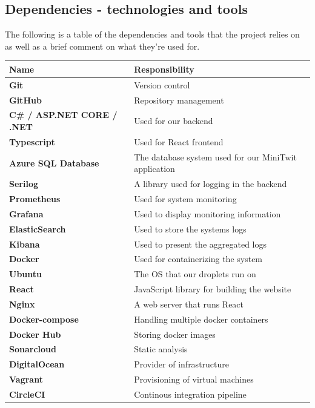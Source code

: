 \subsection{Dependencies - technologies and tools}
The following is a table of the dependencies and tools that the project relies on as well as a brief comment on what they're used for.
\begin{center}
\begin{tabularx}{\textwidth}{|X|l|}
 \hline
 \textbf{Name} & \textbf{Responsibility}  \\ [0.5ex] 
 \hline\hline
 \textbf{Git} & Version control  \\ 
 \hline
 \textbf{GitHub} & Repository management \\
 \hline
 \textbf{C\# / ASP.NET CORE / .NET} & Used for our backend \\
 \hline
 \textbf{Typescript} & Used for React frontend \\
 \hline
 \textbf{Azure SQL Database} & The database system used for our MiniTwit application\\ 
 \hline
 \textbf{Serilog} & A library used for logging in the backend \\
 \hline
 \textbf{Prometheus} & Used for system monitoring \\
 \hline
 \textbf{Grafana} & Used to display monitoring information\\
 \hline
 \textbf{ElasticSearch} & Used to store the systems logs \\
 \hline
 \textbf{Kibana} & Used to present the aggregated logs \\
 \hline
 \textbf{Docker} & Used for containerizing the system \\
 \hline
 \textbf{Ubuntu} & The OS that our droplets run on\\
 \hline
 \textbf{React} & JavaScript library for building the website \\
 \hline
 \textbf{Nginx} & A web server that runs React\\
 \hline
 \textbf{Docker-compose} & Handling multiple docker containers \\
 \hline
 \textbf{Docker Hub} & Storing docker images \\
 \hline
 \textbf{Sonarcloud} & Static analysis \\
 \hline
 \textbf{DigitalOcean} & Provider of infrastructure \\
 \hline
 \textbf{Vagrant} & Provisioning of virtual machines \\
 \hline
 \textbf{CircleCI} & Continous integration pipeline \\

\end{tabularx}
\end{center}
